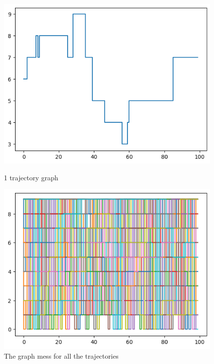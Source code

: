 \begin{figure}[H]
    \centering
    \begin{minipage}[b]{0.49\textwidth}
        \centering
        \includegraphics[width=\textwidth]{../pictures/2.f.1.png}
        \caption*{1 trajectory graph}
    \end{minipage}
    \hfill
    \begin{minipage}[b]{0.49\textwidth}
        \centering
        \includegraphics[width=\textwidth]{../pictures/2.f.2.png}
        \caption*{The graph mess for all the trajectories}
    \end{minipage}
\end{figure}

